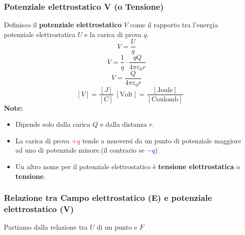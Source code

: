 \documentclass[twoside]{article}
\begin{document}
\subsubsection{Potenziale elettrostatico V (o Tensione)}
Definisco il \textbf{potenziale elettrostatico} \(V\) come il rapporto tra l'energia potenziale elettrostatica \(U\) e la carica di prova \(q\).
\begin{equation*}
    V = \displaystyle \frac{U}{q}
\end{equation*}
\begin{equation*}
    V = \displaystyle \frac{1}{q} \cdot \frac{qQ}{4\pi \varepsilon_0 r}
\end{equation*}
\begin{equation}
    \boxed{V = \displaystyle \frac{Q}{4\pi \varepsilon_0 r}}
\end{equation}
\begin{equation*}
    \quad \left[V\right] = \frac{\left[J\right]}{\left[C\right]}\ \left[\text{Volt}\right] = \frac{\left[\text{Joule}\right]}{\left[\text{Coulomb}\right]}
\end{equation*}
\textbf{Note:}
\begin{itemize}
    \item Dipende solo dalla carica \(Q\) e dalla distanza \(r\).
    \item La carica di prova \textcolor{red}{\(+q\)} tende a muoversi da un punto di potenziale maggiore ad uno di potenziale minore.(il contrario se \textcolor{blue}{\(-q\)})
    \item Un altro nome per il potenziale elettrostatico è \textbf{tensione elettrostatica} o \textbf{tensione}.
\end{itemize}
\subsubsection{Relazione tra Campo elettrostatico (E) e potenziale elettrostatico (V)}
Partiamo dalla relazione tra \(U\) di un punto e \(F\)
\end{document}
